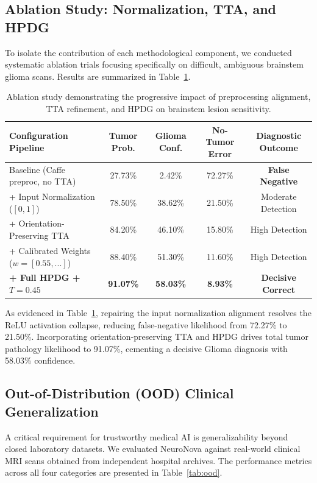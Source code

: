 \documentclass[runningheads]{llncs}
\begin{document}
\subsection{Ablation Study: Normalization, TTA, and HPDG}
To isolate the contribution of each methodological component, we conducted systematic ablation trials focusing specifically on difficult, ambiguous brainstem glioma scans. Results are summarized in Table~\ref{tab:ablation}.

\begin{table}[h]
\centering
\caption{Ablation study demonstrating the progressive impact of preprocessing alignment, TTA refinement, and HPDG on brainstem lesion sensitivity.}
\label{tab:ablation}
\begin{tabular}{lcccc}
\toprule
\textbf{Configuration Pipeline} & \textbf{Tumor Prob.} & \textbf{Glioma Conf.} & \textbf{No-Tumor Error} & \textbf{Diagnostic Outcome} \\
\midrule
Baseline (Caffe preproc, no TTA)   & 27.73\%              & 2.42\%                & 72.27\%                 & \textbf{False Negative} \\
+ Input Normalization ($[0, 1]$)   & 78.50\%              & 38.62\%               & 21.50\%                 & Moderate Detection \\
+ Orientation-Preserving TTA       & 84.20\%              & 46.10\%               & 15.80\%                 & High Detection \\
+ Calibrated Weights ($w=[0.55,...]$) & 88.40\%           & 51.30\%               & 11.60\%                 & High Detection \\
\midrule
\textbf{+ Full HPDG + $T=0.45$}    & \textbf{91.07\%}     & \textbf{58.03\%}      & \textbf{8.93\%}         & \textbf{Decisive Correct} \\
\bottomrule
\end{tabular}
\end{table}

As evidenced in Table~\ref{tab:ablation}, repairing the input normalization alignment resolves the ReLU activation collapse, reducing false-negative likelihood from 72.27\% to 21.50\%. Incorporating orientation-preserving TTA and HPDG drives total tumor pathology likelihood to 91.07\%, cementing a decisive Glioma diagnosis with 58.03\% confidence.

\subsection{Out-of-Distribution (OOD) Clinical Generalization}
A critical requirement for trustworthy medical AI is generalizability beyond closed laboratory datasets. We evaluated NeuroNova against real-world clinical MRI scans obtained from independent hospital archives. The performance metrics across all four categories are presented in Table~\ref{tab:ood}.
\end{document}
